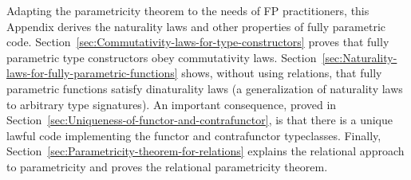 Adapting the parametricity theorem to the needs of FP practitioners,
this Appendix derives the naturality laws and other properties of
fully parametric code. Section~\ref{sec:Commutativity-laws-for-type-constructors}
proves that fully parametric type constructors obey commutativity
laws. Section~\ref{sec:Naturality-laws-for-fully-parametric-functions}
shows, without using relations, that fully parametric functions satisfy
dinaturality laws (a generalization of naturality laws to arbitrary
type signatures). An important consequence, proved in Section~\ref{sec:Uniqueness-of-functor-and-contrafunctor},
is that there is a unique lawful code implementing the functor and
contrafunctor typeclasses. Finally, Section~\ref{sec:Parametricity-theorem-for-relations}
explains the relational approach to parametricity and proves the relational
parametricity theorem. %
\begin{comment}
Additional literature:

{[}1{]}: Girard, J.-Y.; Scedrov, A. \& Scott, P. J. Normal Forms and
Cut-Free Proofs as Natural Transformations. Logic From Computer Science,
Mathematical Science Research Institute Publications 21, Springer-Verlag,
1992, 217-241. http://citeseer.ist.psu.edu/viewdoc/summary?doi=10.1.1.41.811

{[}2{]}: Bainbridge, E. S.; Freyd, P. J.; Scedrov, A. \& Scott, P.
J. Functorial polymorphism. Theoretical computer science, Elsevier,
1990, 70, 35-64. https://core.ac.uk/display/82270459

{[}3{]}: De Lataillade, J. Dinatural Terms in System F. Logic in Computer
Science, 24th Annual IEEE Symposium, 267-276, 2009. https://www.irif.fr/\textasciitilde delatail/dinat.pdf

{[}4{]}: Pistone, P. On completeness and parametricity in the realizability
semantics of System F. https://arxiv.org/abs/1802.05143

{[}5{]}: https://libres.uncg.edu/ir/asu/f/Johann\_Patricia\_2014\_A\_Relationally\_Parametric\_Model\_Of\_Dependent\_Type\_Theory..pdf

See discussion here: https://cstheory.stackexchange.com/questions/42256/is-case-analysis-on-normal-forms-of-lambda-terms-sufficient-to-prove-parametrici
\end{comment}

